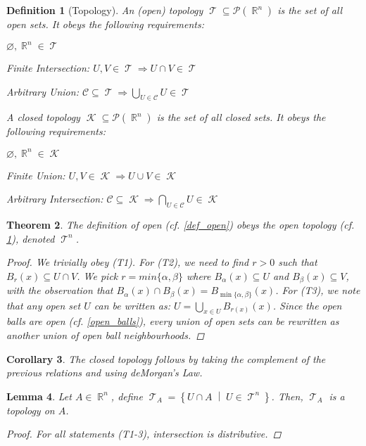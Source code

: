 \documentclass[12pt]{article}
\let\emptyset\varnothing
\let\RA\Rightarrow
\newcommand{\set}[2]{\left\{{#1}\;\middle|\;{#2}\right\}}
\DeclareMathOperator{\R}{\mathbb{R}}
\DeclareMathOperator{\T}{\mathcal{T}}
\DeclareMathOperator{\K}{\mathcal{K}}
\newtheorem{theorem}{Theorem}[subsection]
\newtheorem{definition}[theorem]{Definition}
\newtheorem{lemma}[theorem]{Lemma}
\newtheorem{corollary}[theorem]{Corollary}
\begin{document}
\begin{definition}[Topology]
  \label{def_topology}
  An (open) topology $\T\subseteq\mathcal{P}(\R^n)$ is the set of all open sets. It obeys the following requirements:
  \begin{compactenum}[(T1)]
    \item $\emptyset,\R^n\in\T$
    \item Finite Intersection: $U,V\in\T\RA U\cap V\in\T$
    \item Arbitrary Union: $\mathcal{C}\subseteq\T\RA \displaystyle\bigcup_{U\in\mathcal{C}}U\in\T$
  \end{compactenum}
  
  \noindent A closed topology $\K\subseteq\mathcal{P}(\R^n)$ is the set of all closed sets. It obeys the following requirements:
  \begin{compactenum}[(K1)]
    \item $\emptyset,\R^n\in\K$
    \item Finite Union: $U,V\in\K\RA U\cup V\in\K$
    \item Arbitrary Intersection: $\mathcal{C}\subseteq\K\RA \displaystyle\bigcap_{U\in\mathcal{C}}U\in\K$
  \end{compactenum}
\end{definition}

\begin{theorem}
  \label{rn_top}
  The definition of open (cf. \ref{def_open}) obeys the open topology (cf. \ref{def_topology}), denoted $\T^n$.
  \begin{proof}
    We trivially obey (T1). For (T2), we need to find $r>0$ such that $B_r(x)\subseteq U\cap V$. We pick $r=min\{\alpha,\beta\}$ where $B_\alpha(x)\subseteq U$ and $B_\beta(x)\subseteq V$, with the observation that $B_\alpha(x)\cap B_\beta(x)=B_{\min\{\alpha,\beta\}}(x)$. For (T3), we note that any open set $U$ can be written as: $U=\bigcup_{x\in U}B_{r(x)}(x)$. Since the open balls are open (cf. \ref{open_balls}), every union of open sets can be rewritten as another union of open ball neighbourhoods.
  \end{proof}
\end{theorem}

\begin{corollary}
  The closed topology follows by taking the complement of the previous relations and using deMorgan's Law.
\end{corollary}

\begin{lemma}
  \label{subset_top}
  Let $A\in\R^n$, define $\T_A=\set{U\cap A}{U\in\T^n}$. Then, $\T_A$ is a topology on $A$.
  \begin{proof}
    For all statements (T1-3), intersection is distributive.
  \end{proof}
\end{lemma}
\end{document}
